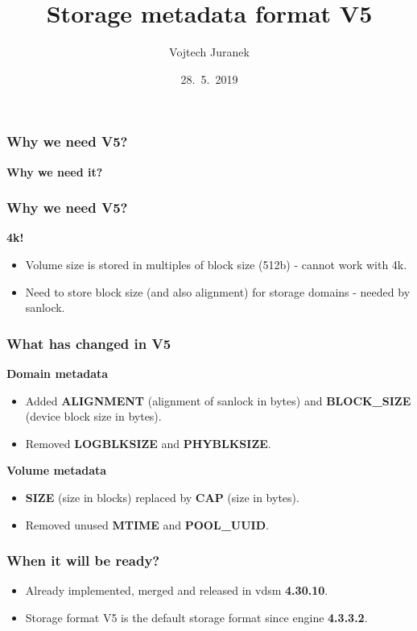 \documentclass[10pt,utf8]{beamer}
\title{Storage metadata format V5}
\author{Vojtech Juranek}
\institute[Red Hat]{oVirt storage team}
\date{28.~5.~2019}
\begin{document}
\begin{frame}
 \titlepage
\end{frame}

\begin{frame}
  \frametitle{Why we need V5?}
	\centering
	\huge{\textbf{Why we need it?}}
\end{frame}

\begin{frame}
  \frametitle{Why we need V5?}
	\centering
	\huge{\textbf{4k!}}
	\normalsize
	\vspace{1cm}
	\begin{itemize}
		\item Volume size is stored in multiples of block size (512b) - cannot work with 4k.
		\item Need to store block size (and also alignment) for storage domains - needed by sanlock.
	\end{itemize}
\end{frame}

\begin{frame}
	\frametitle{What has changed in V5}
	\centering
	\Large{\textbf{Domain metadata}}
	\normalsize
	\vspace{0.5cm}
	\begin{itemize}
		\item Added \textbf{ALIGNMENT} (alignment of sanlock in bytes) and \textbf{BLOCK\_SIZE} (device block size in bytes).
		\item Removed \textbf{LOGBLKSIZE} and \textbf{PHYBLKSIZE}.
	\end{itemize}
	
	\vspace{1cm}
	
	\centering
	\Large{\textbf{Volume metadata}}
	\normalsize
	\vspace{0.5cm}
	\begin{itemize}
		\item \textbf{SIZE} (size in blocks) replaced by \textbf{CAP} (size in bytes).
		\item Removed unused \textbf{MTIME} and \textbf{POOL\_UUID}.
	\end{itemize}

\end{frame}

\begin{frame}
	\frametitle{When it will be ready?}
	\begin{itemize}
		\item Already implemented, merged and released in vdsm \textbf{4.30.10}.
		\item Storage format V5 is the default storage format since engine \textbf{4.3.3.2}.
	\end{itemize}
\end{frame}
\end{document}
